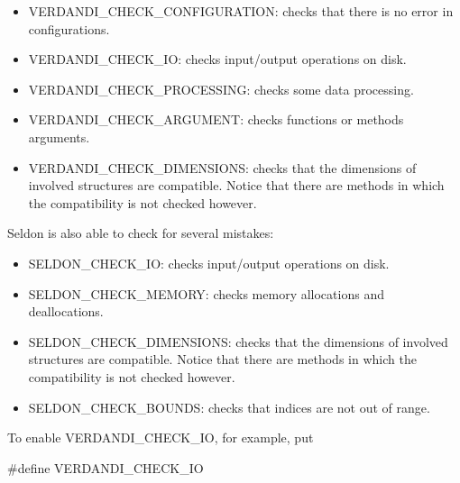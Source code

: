 \documentclass{tufte-book}
\begin{document}
\begin{itemize}
\item \-V\-E\-R\-D\-A\-N\-D\-I\-\_\-\-C\-H\-E\-C\-K\-\_\-\-C\-O\-N\-F\-I\-G\-U\-R\-A\-T\-I\-O\-N\-: checks that there is no error in configurations.


\item \-V\-E\-R\-D\-A\-N\-D\-I\-\_\-\-C\-H\-E\-C\-K\-\_\-\-I\-O\-: checks input/output operations on disk.


\item \-V\-E\-R\-D\-A\-N\-D\-I\-\_\-\-C\-H\-E\-C\-K\-\_\-\-P\-R\-O\-C\-E\-S\-S\-I\-N\-G\-: checks some data processing.


\item \-V\-E\-R\-D\-A\-N\-D\-I\-\_\-\-C\-H\-E\-C\-K\-\_\-\-A\-R\-G\-U\-M\-E\-N\-T\-: checks functions or methods arguments.


\item \-V\-E\-R\-D\-A\-N\-D\-I\-\_\-\-C\-H\-E\-C\-K\-\_\-\-D\-I\-M\-E\-N\-S\-I\-O\-N\-S\-: checks that the dimensions of involved structures are compatible. \-Notice that there are methods in which the compatibility is not checked however.


\end{itemize}

\-Seldon is also able to check for several mistakes\-:


\begin{itemize}
\item \-S\-E\-L\-D\-O\-N\-\_\-\-C\-H\-E\-C\-K\-\_\-\-I\-O\-: checks input/output operations on disk.


\item \-S\-E\-L\-D\-O\-N\-\_\-\-C\-H\-E\-C\-K\-\_\-\-M\-E\-M\-O\-R\-Y\-: checks memory allocations and deallocations.


\item \-S\-E\-L\-D\-O\-N\-\_\-\-C\-H\-E\-C\-K\-\_\-\-D\-I\-M\-E\-N\-S\-I\-O\-N\-S\-: checks that the dimensions of involved structures are compatible. \-Notice that there are methods in which the compatibility is not checked however.


\item \-S\-E\-L\-D\-O\-N\-\_\-\-C\-H\-E\-C\-K\-\_\-\-B\-O\-U\-N\-D\-S\-: checks that indices are not out of range.


\end{itemize}

\-To enable {\ttfamily \-V\-E\-R\-D\-A\-N\-D\-I\-\_\-\-C\-H\-E\-C\-K\-\_\-\-I\-O}, for example, put

 \begin{frame_cpp}
 #define VERDANDI_CHECK_IO
 \end{frame_cpp}
\end{document}
